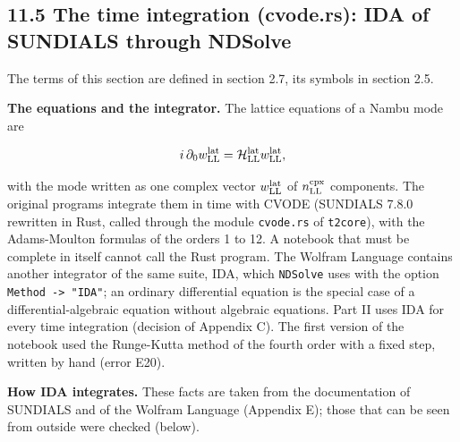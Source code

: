 \documentclass[
  10pt,
]{article}
\begin{document}
\hypertarget{the-time-integration-cvode.rs-ida-of-sundials-through-ndsolve}{%
\subsection{11.5 The time integration (cvode.rs): IDA of SUNDIALS
through
NDSolve}\label{the-time-integration-cvode.rs-ida-of-sundials-through-ndsolve}}

The terms of this section are defined in section 2.7, its symbols in
section 2.5.

\textbf{The equations and the integrator.} The lattice equations of a
Nambu mode are

\[i\,\partial_0w^{\rm lat}_{\rm LL}=\mathcal H^{\rm lat}_{\rm LL}w^{\rm lat}_{\rm LL},\]

with the mode written as one complex vector \(w^{\rm lat}_{\rm LL}\) of
\(n^{\rm cpx}_{\rm LL}\) components. The original programs integrate
them in time with CVODE (SUNDIALS 7.8.0 rewritten in Rust, called
through the module \texttt{cvode.rs} of \texttt{t2core}), with the
Adams-Moulton formulas of the orders 1 to 12. A notebook that must be
complete in itself cannot call the Rust program. The Wolfram Language
contains another integrator of the same suite, IDA, which
\texttt{NDSolve} uses with the option
\texttt{Method\ -\textgreater{}\ "IDA"}; an ordinary differential
equation is the special case of a differential-algebraic equation
without algebraic equations. Part II uses IDA for every time integration
(decision of Appendix C). The first version of the notebook used the
Runge-Kutta method of the fourth order with a fixed step, written by
hand (error E20).

\textbf{How IDA integrates.} These facts are taken from the
documentation of SUNDIALS and of the Wolfram Language (Appendix E);
those that can be seen from outside were checked (below).
\end{document}
